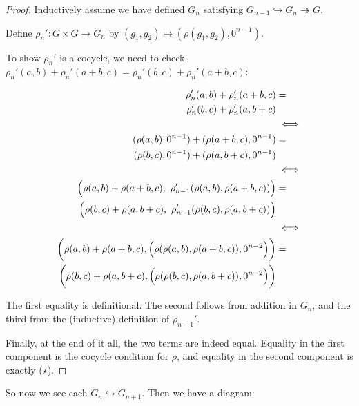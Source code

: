 \documentclass[12pt]{article}
\theoremstyle{definition}
\newcommand{\mono}{\hookrightarrow}
\newcommand{\epi}{\twoheadrightarrow}
\begin{document}
  \begin{proof}
    Inductively assume we have defined $G_n$ satisfying $G_{n-1} \mono G_n \epi G$. 
    
    Define $\rho_n' : G \times G \to G_n$ by 
    $(g_1,g_2) \mapsto (\rho(g_1,g_2), 0^{n-1})$.

    To show $\rho_n'$ is a cocycle, we need to check
    $\rho_n'(a,b) + \rho_n'(a+b,c) = \rho_n'(b,c) + \rho_n'(a+b,c)$:

    \begin{align*}
    \centering
      \rho_n'(a,b) + \rho_n'(a+b,c) &= \\ 
      \rho_n'(b,c) + \rho_n'(a,b+c) \\
      &\iff \\ 
      (\rho(a,b),0^{n-1}) + (\rho(a+b,c),0^{n-1}) &= \\
      (\rho(b,c), 0^{n-1}) + (\rho(a,b+c),0^{n-1}) \\ 
      &\iff \\
      \Big ( \rho(a,b) + \rho(a+b,c),~\rho_{n-1}'(\rho(a,b), \rho(a+b,c)) \Big ) &= \\ 
      \Big ( \rho(b,c) + \rho(a,b+c),~\rho_{n-1}'(\rho(b,c), \rho(a,b+c)) \Big )\\
      &\iff \\
      \bigg ( 
        \rho(a,b) + \rho(a+b,c), 
        \Big ( \rho(\rho(a,b),\rho(a+b,c)), 0^{n-2} \Big )
      \bigg ) &= \\
      \bigg ( 
        \rho(b,c) + \rho(a,b+c), 
        \Big ( \rho(\rho(b,c), \rho(a,b+c)),0^{n-2} \Big )
      \bigg )
    \end{align*}

    The first equality is definitional. 
    The second follows from addition in $G_n$,
    and the third from the (inductive) definition of $\rho_{n-1}'$.

    Finally, at the end of it all, the two terms are indeed equal. Equality
    in the first component is the cocycle condition for $\rho$, and equality
    in the second component is exactly ($\star$).
  \end{proof}

  So now we see each $G_n \mono G_{n+1}$. Then we have a diagram:

  \begin{center}
  \end{center}
\end{document}
